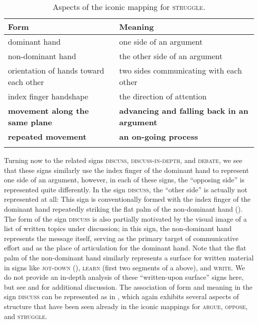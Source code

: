 \documentclass[output=paper,
modfonts
]{LSP/langsci}
\begin{document}
\begin{table}
\caption{Aspects of the iconic mapping for \textsc{struggle}.}
\label{tab:7}
\begin{tabularx}{\linewidth}{XX}
\lsptoprule
Form & Meaning\\
\midrule
dominant hand & one side of an argument\\

non-dominant hand & the other side of an argument\\

orientation of hands toward each other & two sides communicating with each other\\

index finger handshape & the direction of attention\\

\textbf{movement along the same plane} & \textbf{advancing and falling back in an argument}\\

\textbf{repeated movement} & \textbf{an on-going process}\\
\lspbottomrule
\end{tabularx}
\end{table}

  Turning now to the related signs \textsc{discuss}, \textsc{discuss-in-depth}, and \textsc{debate}, we see that these signs similarly use the index finger of the dominant hand to represent one side of an argument, however, in each of these signs, the ``opposing side'' is represented quite differently. In the sign \textsc{discuss}, the ``other side'' is actually not represented at all: This sign\textsc{} is conventionally formed with the index finger of the dominant hand repeatedly striking the flat palm of the non-dominant hand (). The form of the sign \textsc{discuss} is also partially motivated by the visual image of a list of written topics under discussion; in this sign, the non-dominant hand represents the message itself, serving as the primary target of communicative effort and as the place of articulation for the dominant hand. Note that the flat palm of the non-dominant hand similarly represents a surface for written material in signs like \textsc{jot-down} (), \textsc{learn} (first two segments of a above), and \textsc{write}. We do not provide an in-depth analysis of these ``written-upon surface'' signs here, but see \citet[118]{Frishberg1973} and \citet[75]{Aronoff2003} for additional discussion. The association of form and meaning in the sign \textsc{discuss} can be represented as in , which again exhibits several aspects of structure that have been seen already in the iconic mappings for \textsc{argue, oppose}, and \textsc{struggle}.
  
\end{document}
